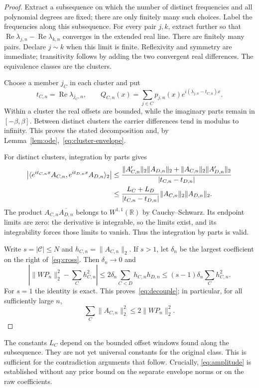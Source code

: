 \documentclass[11pt]{article}
\theoremstyle{definition}
\theoremstyle{remark}
\newcommand{\R}{\mathbb R}
\newcommand{\ip}[2]{\langle #1,#2\rangle}
\newcommand{\norm}[1]{\lVert #1\rVert}
\DeclareMathOperator{\Rea}{Re}
\begin{document}
\begin{proof}
Extract a subsequence on which the number of distinct frequencies and all
polynomial degrees are fixed; there are only finitely many such choices.
Label the frequencies along this subsequence. For every pair $j,k$, extract
further so that $\Rea\lambda_{j,n}-\Rea\lambda_{k,n}$ converges in the
extended real line. There are finitely many pairs. Declare $j\sim k$ when
this limit is finite. Reflexivity and symmetry are immediate; transitivity
follows by adding the two convergent real differences. The equivalence
classes are the clusters.

Choose a member $j_C$ in each cluster and put
\[
 t_{C,n}=\Rea\lambda_{j_C,n},\qquad
 Q_{C,n}(x)=\sum_{j\in C}p_{j,n}(x)
 e^{i(\lambda_{j,n}-t_{C,n})x}.
\]
Within a cluster the real offsets are bounded, while the imaginary parts
remain in $[-\beta,\beta]$. Between distinct clusters the carrier differences
tend in modulus to infinity. This proves the stated decomposition and,
by Lemma~\ref{lem:ode},~\eqref{eq:cluster-envelope}.

For distinct clusters, integration by parts gives
\begin{align}\label{eq:cross}
 \left|\ip{e^{it_{C,n}x}A_{C,n}}{e^{it_{D,n}x}A_{D,n}}_2\right|
 &\le\frac{\norm{A_{C,n}'}_2\norm{A_{D,n}}_2+
 \norm{A_{C,n}}_2\norm{A_{D,n}'}_2}{|t_{C,n}-t_{D,n}|}\notag\\
 &\le\frac{L_C+L_D}{|t_{C,n}-t_{D,n}|}
 \norm{A_{C,n}}_2\norm{A_{D,n}}_2.
\end{align}
The product $A_{C,n}\overline{A_{D,n}}$ belongs to $W^{1,1}(\R)$ by
Cauchy--Schwarz. Its endpoint limits are zero: the derivative is integrable,
so the limits exist, and its integrability forces those limits to vanish.
Thus the integration by parts is valid.

Write $s=|\mathcal C|\le N$ and $h_{C,n}=\norm{A_{C,n}}_2$. If $s>1$,
let $\delta_n$ be the largest coefficient on the right of~\eqref{eq:cross}.
Then $\delta_n\to0$ and
\[
 \left|\norm{WP_n}_2^2-\sum_C h_{C,n}^2\right|
 \le2\delta_n\sum_{C<D}h_{C,n}h_{D,n}
 \le(s-1)\delta_n\sum_C h_{C,n}^2.
\]
For $s=1$ the identity is exact. This proves~\eqref{eq:decouple}; in
particular, for all sufficiently large $n$,
\begin{equation}\label{eq:amplitude}
 \sum_C\norm{A_{C,n}}_2^2\le2\norm{WP_n}_2^2.
\end{equation}
\end{proof}

The constants $L_C$ depend on the bounded offset windows found along the
subsequence. They are not yet universal constants for the original class.
This is sufficient for the contradiction arguments that follow. Crucially,
\eqref{eq:amplitude} is established without any prior bound on the separate
envelope norms or on the raw coefficients.
\end{document}

